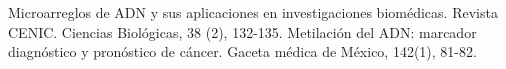 \documentclass[12pt,letterpaper]{article}
\begin{document}
\begin{thebibliography}{XXX0000}
   Microarreglos de ADN y sus aplicaciones en investigaciones biomédicas. Revista CENIC. Ciencias Biológicas, 38 (2), 132-135. 
   Metilación del ADN: marcador diagnóstico y pronóstico de cáncer. Gaceta médica de México, 142(1), 81-82. 
\end{thebibliography} 	
\end{document}
